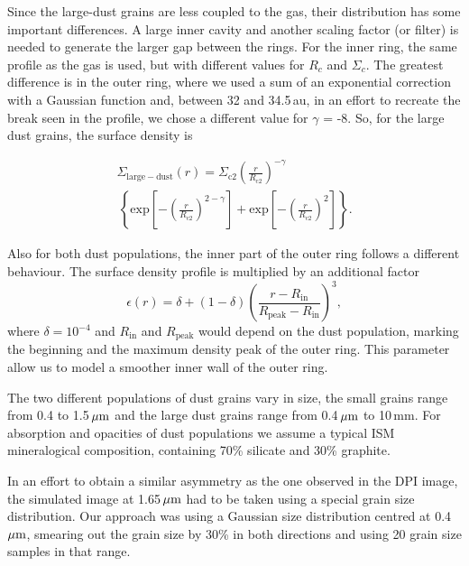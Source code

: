\documentclass[letters,usenatbib,times]{mnras}
\begin{document}
Since the large-dust grains are less coupled to the gas, their distribution has some important differences. A large inner cavity and another scaling factor (or filter) is needed to generate the larger gap between the rings. For the inner ring, the same profile as the gas is used, but with different values for $R_c$ and $\Sigma_c$. The greatest difference is in the outer ring, where we used a sum of an exponential correction with a Gaussian function and, between 32 and 34.5\,au, in an effort to recreate the break seen in the profile, we chose a different value for $\gamma$ = -8. So, for the large dust grains, the surface density is 

\begin{multline}
  \Sigma_{\mathrm{large-dust}}(r) = \Sigma_{\mathrm{c}2} \left(\frac{r}{R_{\mathrm{c}2}}\right)^{-\gamma}  \\ \, \left\{ \mathrm{exp}\left[-\left(\frac{r}{R_{\mathrm{c}2}}\right)^{2-\gamma}\right] +  \mathrm{exp}\left[-\left(\frac{r}{R_{\mathrm{c}2}}\right)^{2}\right]\right\}.
\end{multline}

Also for both dust populations, the inner part of the outer ring follows a different behaviour. The surface density profile is multiplied by an additional factor
\begin{equation}
    \epsilon(r) = \delta +  (1 - \delta) \left(\frac{ r - R_\mathrm{in}}{R_\mathrm{peak} - R_\mathrm{in}}\right)^3,
\end{equation}
where $\delta=10^{-4}$ and $R_\mathrm{in}$ and $R_\mathrm{peak}$ would depend on the dust population, marking the beginning and the maximum density peak of the outer ring. This parameter allow us to model a smoother inner wall of the outer ring.

The two different populations of dust grains vary in size, the small grains range from  0.4 to 1.5\,$\hbox{$\mu$m}$ and the large dust grains range from 0.4\,$\hbox{$\mu$m}$ to 10\,mm. For absorption and opacities of dust populations we assume a typical ISM mineralogical composition, containing 70\% silicate and 30\% graphite.

In an effort to obtain a similar asymmetry as the one observed in the DPI image, the simulated image at 1.65\,$\hbox{$\mu$m}$ had to be taken using a special grain size distribution. Our approach was using a Gaussian size distribution centred at 0.4\,$\hbox{$\mu$m}$, smearing out the grain size by 30\% in both directions and using 20 grain size samples in that range.
\end{document}
